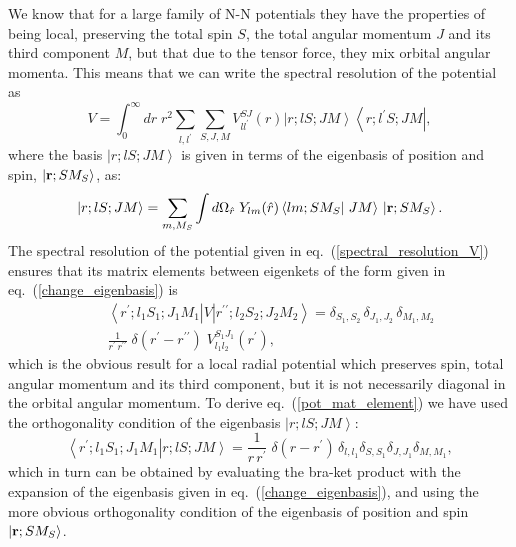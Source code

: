 \documentclass[aps,twocolumn,showpacs,preprintnumbers,amsmath,amssymb,nofootinbib,superscriptaddress,showkeys,noeprint]{revtex4-1}
\newcommand{\nr}{{\bf r}}
\begin{document}
We know that for a large family of N-N potentials they have the
properties of being local, preserving the total spin $S$, the total
angular momentum $J$ and its third component $M$, but that due to the
tensor force, they mix orbital angular momenta. This means that we can
write the spectral resolution of the potential as
\begin{equation}\label{spectral_resolution_V}
V=\int^\infty_0 dr\; r^2 \sum_{l,l^\prime}\sum_{S,J,M} V^{SJ}_{ll^\prime}(r)
\left|r; lS; JM\right\rangle \left\langle r; l^\prime S; JM\right|,
\end{equation}
where the basis $\left| r; lS; JM\right\rangle$ is given in terms of
the eigenbasis of position and spin, $\left|\nr; S M_S\right\rangle$,
as:
\begin{equation}\label{change_eigenbasis}
\left| r; lS; JM\right\rangle=\sum_{m,M_S}\int d\Omega_{\hat{r}}\;
Y_{lm}(\hat{r}) \left\langle lm;SM_S\right|\left.JM\right\rangle\,
\left|\nr;SM_S\right\rangle.
\end{equation}
The spectral resolution of the potential given in
eq.~(\ref{spectral_resolution_V}) ensures that its matrix elements
between eigenkets of the form given in eq.~(\ref{change_eigenbasis})
is
\begin{eqnarray}
&&\left\langle r^\prime;l_1 S_1; J_1 M_1\right|V\left| r^{\prime\prime};
l_2 S_2; J_2 M_2\right\rangle=\delta_{S_1,S_2}\,\delta_{J_1,J_2}\,
\delta_{M_1,M_2}\nonumber\\
&&\frac{1}{r^\prime\,r^{\prime\prime}}\;\delta(r^\prime-r^{\prime\prime})\;
V^{S_1J_1}_{l_1l_2}(r^\prime),\label{pot_mat_element}
\end{eqnarray}
which is the obvious result for a local radial potential which
preserves spin, total angular momentum and its third component, but it
is not necessarily diagonal in the orbital angular momentum.  To
derive eq.~(\ref{pot_mat_element}) we have used the orthogonality
condition of the eigenbasis $\left| r; lS; JM\right\rangle$:
\begin{equation}\label{orthonormality_condition_rlsjm}
\left\langle r^\prime;l_1 S_1; J_1 M_1\right|\left.r;lS;JM\right\rangle=
\frac{1}{r\,r^\prime}\;\delta(r-r^\prime)\,\delta_{l,l_1}\delta_{S,S_1}
\delta_{J,J_1}\delta_{M,M_1},
\end{equation}
which in turn can be obtained by evaluating the bra-ket product with
the expansion of the eigenbasis given in
eq.~(\ref{change_eigenbasis}), and using the more obvious
orthogonality condition of the eigenbasis of position and spin
$\left|\nr; S M_S\right\rangle$.
\end{document}
